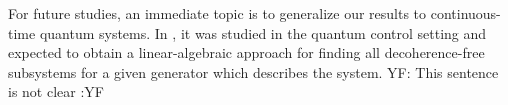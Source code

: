 \documentclass[journal]{IEEEtran}
\newcommand{\authorComment}[3]{\color{#1}#2: {#3} :#2\color{black}}
\newcommand{\yf}[1]{\authorComment{blue}{YF}{#1}}
\begin{document}
For future studies, an immediate topic is to generalize our results to continuous-time quantum systems. In \cite{ticozzi2008quantum}, it was studied in the quantum control setting and expected to obtain a linear-algebraic approach for finding all decoherence-free subsystems  for a given generator which describes the system. \yf{This sentence is not clear}

%
%










%
%
%


% 
\end{document}
